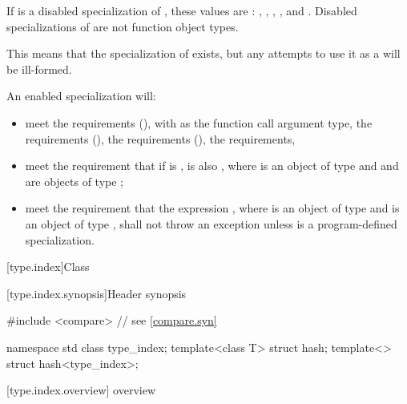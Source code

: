 \pnum
If  is a disabled specialization of ,
these values are :
,
,
,
, and
.
Disabled specializations of 
are not function object types.
\begin{note}
This means that the specialization of  exists, but
any attempts to use it as a  will be ill-formed.
\end{note}

\pnum
An enabled specialization  will:
\begin{itemize}
\item meet the  requirements (),
with  as the function
call argument type, the  requirements (),
the  requirements (),
the  requirements,
\item meet the requirement that if  is ,  is
also , where  is an object of type  and  and 
are objects of type ;
\item meet the requirement that the expression , where 
is an object of type  and  is an object of type
, shall not throw an exception unless  is a
program-defined specialization.
\end{itemize}

[type.index]{Class }

[type.index.synopsis]{Header  synopsis}

%
\begin{codeblock}
#include <compare>              // see \ref{compare.syn}

namespace std {
  class type_index;
  template<class T> struct hash;
  template<> struct hash<type_index>;
}
\end{codeblock}

[type.index.overview]{ overview}

